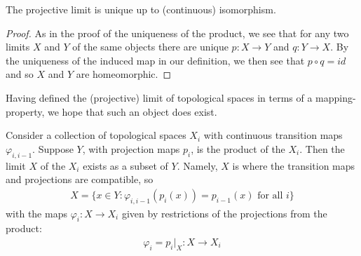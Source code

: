       \begin{claim}
        The projective limit is unique up to (continuous) isomorphism.
        \begin{proof}
          As in the proof of the uniqueness of the product, we see that for any two limits $X$ and $Y$ of the same objects there are unique $p:X\rightarrow Y$ and $q:Y\rightarrow X$.
          By the uniqueness of the induced map in our definition, we then see that $p\circ q=id$ and so $X$ and $Y$ are homeomorphic.
        \end{proof}
      \end{claim}

      Having defined the (projective) limit of topological spaces in terms of a mapping-property, we hope that such an object does exist.
      \begin{thm}
        \label{claim:limitexists}
        Consider a collection of topological spaces $X_i$ with continuous transition maps $\varphi_{i,i-1}$.
        Suppose $Y$, with projection maps $p_i$, is the product of the $X_i$.
        Then the limit $X$ of the $X_i$ exists as a subset of $Y$.
        Namely, $X$ is where the transition maps and projections are compatible, so
        \begin{align*}
          X = \{x\in Y: \varphi_{i,i-1}(p_i(x)) = p_{i-1}(x) \text{ for all } i\}
        \end{align*}
        with the maps $\varphi_i:X\rightarrow X_i$ given by restrictions of the projections from the product:
        \begin{align*}
          \varphi_i = p_i|_X :X\rightarrow X_i
        \end{align*}
      \end{thm}
